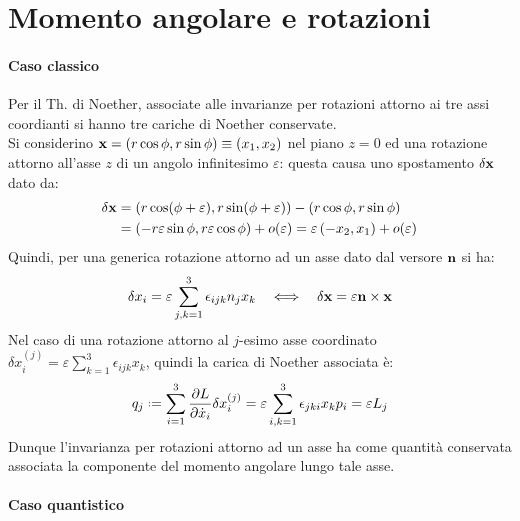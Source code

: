 
\section{Momento angolare e rotazioni}

\paragraph{Caso classico}

Per il Th. di Noether, associate alle invarianze per rotazioni attorno ai tre assi coordianti si hanno tre cariche di Noether conservate.\\
Si considerino $ \mathbf{x} = \left( r\cos \phi, r\sin \phi \right) \equiv \left( x_1, x_2 \right) $ nel piano $ z = 0 $ ed una rotazione attorno all'asse $ z $ di un angolo infinitesimo $ \varepsilon $: questa causa uno spostamento $ \delta\mathbf{x} $ dato da:
\begin{equation*}
	\begin{split}
		\delta\mathbf{x}
		&= \left( r\cos (\phi + \varepsilon), r\sin (\phi + \varepsilon) \right) - \left( r\cos \phi, r\sin \phi \right)\\
		&= \left( -r \varepsilon \sin \phi, r \varepsilon \cos \phi \right) + o(\varepsilon) = \varepsilon \left( -x_2, x_1 \right) + o(\varepsilon)
	\end{split}
\end{equation*}
Quindi, per una generica rotazione attorno ad un asse dato dal versore $ \mathbf{n} $ si ha:
\begin{equation}
	\delta x_i = \varepsilon \sum_{j,k = 1}^{3} \epsilon_{ijk} n_j x_k \quad\Longleftrightarrow\quad \delta\mathbf{x} = \varepsilon \mathbf{n}\times\mathbf{x}
	\label{eq:2.1}
\end{equation}
Nel caso di una rotazione attorno al $ j $-esimo asse coordinato $ \delta x_i^{(j)} = \varepsilon \sum_{k = 1}^{3} \epsilon_{ijk} x_k $, quindi la carica di Noether associata è:
\begin{equation}
	q_j \defeq \sum_{i = 1}^{3} \frac{\pa L}{\pa \dot{x}_i} \delta x_i^{(j)} = \varepsilon \sum_{i,k = 1}^{3} \epsilon_{jki} x_k p_i = \varepsilon L_j
	\label{eq:2.2}
\end{equation}
Dunque l'invarianza per rotazioni attorno ad un asse ha come quantità conservata associata la componente del momento angolare lungo tale asse.

\paragraph{Caso quantistico}

